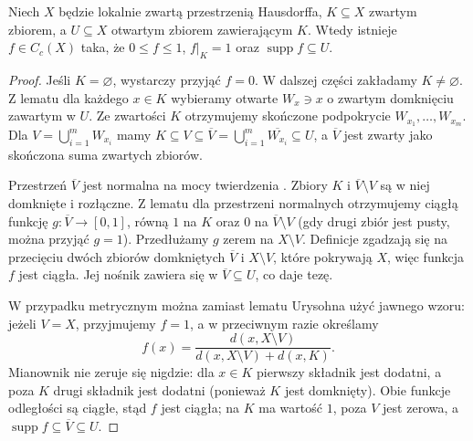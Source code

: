 \begin{lemat}
\label{lem:cutoff-radon-20}
Niech $X$ będzie lokalnie zwartą przestrzenią Hausdorffa,
$K\subseteq X$ zwartym zbiorem, a $U\subseteq X$
otwartym zbiorem zawierającym $K$. Wtedy istnieje
$f\in C_c(X)$ taka, że $0\le f\le1$, $f|_K=1$
oraz $\operatorname{supp}f\subseteq U$.
\end{lemat}
\begin{proof}
Jeśli $K=\varnothing$, wystarczy przyjąć $f=0$.
W dalszej części zakładamy $K\neq\varnothing$.
Z lematu  dla każdego $x\in K$
wybieramy otwarte $W_x\ni x$ o zwartym domknięciu zawartym
w $U$. Ze zwartości $K$ otrzymujemy skończone podpokrycie
$W_{x_1},\ldots,W_{x_m}$. Dla
$V=\bigcup_{i=1}^m W_{x_i}$ mamy
$K\subseteq V\subseteq\overline V=\bigcup_{i=1}^m\overline{W_{x_i}}\subseteq U$,
a $\overline V$ jest zwarty jako skończona suma zwartych zbiorów.

Przestrzeń $\overline V$ jest normalna na mocy twierdzenia
.
Zbiory $K$ i $\overline V\setminus V$ są w niej domknięte i rozłączne.
Z lematu  dla przestrzeni normalnych otrzymujemy ciągłą funkcję $g:\overline V\to[0,1]$, równą $1$ na $K$ oraz $0$ na $\overline V\setminus V$ (gdy drugi zbiór jest pusty, można przyjąć $g=1$). Przedłużamy $g$ zerem na $X\setminus V$. Definicje zgadzają się na przecięciu dwóch zbiorów domkniętych $\overline V$ i $X\setminus V$, które pokrywają $X$, więc funkcja $f$ jest ciągła. Jej nośnik zawiera się w $\overline V\subseteq U$, co daje tezę.

W przypadku metrycznym można zamiast lematu Urysohna użyć jawnego wzoru: jeżeli $V=X$, przyjmujemy $f=1$, a w przeciwnym razie określamy
\[
 f(x)=\frac{d(x,X\setminus V)}
 {d(x,X\setminus V)+d(x,K)}.
\]
Mianownik nie zeruje się nigdzie: dla $x\in K$
pierwszy składnik jest dodatni, a poza $K$ drugi
składnik jest dodatni (ponieważ $K$ jest domknięty).
Obie funkcje odległości są ciągłe, stąd $f$ jest
ciągła; na $K$ ma wartość $1$, poza $V$ jest zerowa,
a $\operatorname{supp}f\subseteq\overline V\subseteq U$.
\end{proof}


